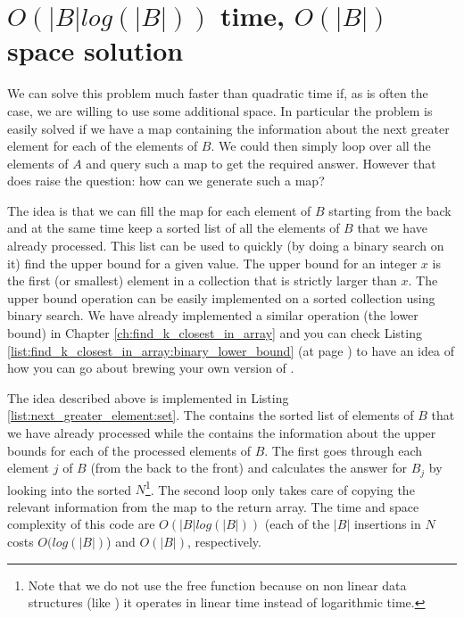 \section{$O(|B|log(|B|))$ time, $O(|B|)$ space solution}
\label{next_greater_element:sec:nlogntime}
We can solve this problem much faster than quadratic time if, as is often the case,  we are willing to use some additional
space. In particular the problem is easily solved if we have
a map containing the information about the next greater element for each of the elements of $B$. We
could then simply loop over all the elements of $A$ and query such a map to get the required answer.
However that does raise the question: how can we generate such a map?

The idea is that we can fill the map for each element of $B$ starting from the back and at the same
time keep a sorted list of all the elements of $B$ that we have already processed. This list can be
used to quickly (by doing a binary search on it) find the upper bound for a given value. The upper
bound for an integer $x$ is the first (or smallest) element in a collection that is strictly larger
than $x$. The upper bound operation can be easily implemented on a sorted collection using binary
search. We have already implemented a similar operation (the lower bound) in Chapter
\ref{ch:find_k_closest_in_array} and you can check Listing
\ref{list:find_k_closest_in_array:binary_lower_bound} (at page
\pageref{list:find_k_closest_in_array:binary_lower_bound}) to have an idea of how you can go about
brewing  your own version of .


The idea described above is implemented in Listing \ref{list:next_greater_element:set}. The
 contains the sorted list of elements of $B$ that we have already processed
while the  contains the information about the upper bounds
for each of the processed elements of $B$. The first  goes through each element $j$ of
$B$ (from the back to the front) and calculates the answer for $B_j$ by looking into the sorted
 $N$\footnote{Note that we do not use the free function
\href{https://en.cppreference.com/w/cpp/algorithm/upper_bound}{} because on
non linear data structures (like ) it operates in linear time instead of
logarithmic time.}. The second  loop only takes care of copying the relevant information
from the map  to the return array. The time and space complexity of this code are
$O(|B|log(|B|))$ (each of the $|B|$ insertions in $N$ costs $O(log(|B|)$) and $O(|B|)$,
respectively.

